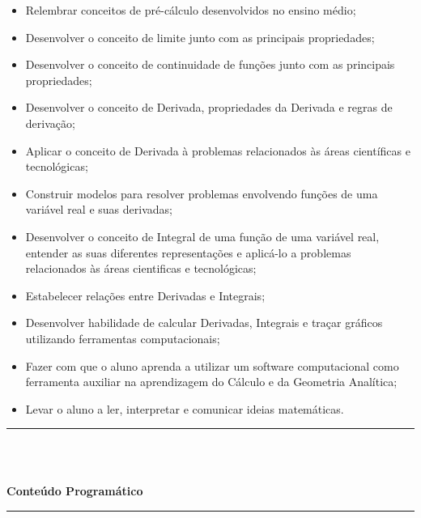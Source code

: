 \begin{itemize}
\item Relembrar conceitos de pré-cálculo desenvolvidos no ensino médio;
\item Desenvolver o conceito de limite junto com as principais propriedades;
\item Desenvolver o conceito de continuidade de funções junto com as principais propriedades;
\item Desenvolver o conceito de Derivada, propriedades da Derivada e regras de derivação;
\item Aplicar o conceito de Derivada à problemas relacionados às áreas científicas e tecnológicas;
\item Construir modelos para resolver problemas envolvendo funções de uma variável real e suas derivadas;
\item Desenvolver o conceito de Integral de uma função de uma variável real, entender as suas diferentes representações e aplicá-lo a problemas relacionados às áreas cientificas e tecnológicas;
\item Estabelecer relações entre Derivadas e Integrais;
\item Desenvolver habilidade de calcular Derivadas, Integrais e traçar gráficos utilizando ferramentas computacionais;
\item Fazer com que o aluno aprenda a utilizar um software computacional como ferramenta auxiliar na aprendizagem do Cálculo e da Geometria Analítica;
\item  Levar o aluno a ler, interpretar e comunicar ideias matemáticas.
\end{itemize} 
\noindent\rule{16.5cm}{0.4pt}\\
\\
\vspace{-12mm}
\begin{center}\textbf{Conteúdo Programático}\end{center}
\vspace{-5mm}
\noindent\rule{16.5cm}{0.4pt}
\\
